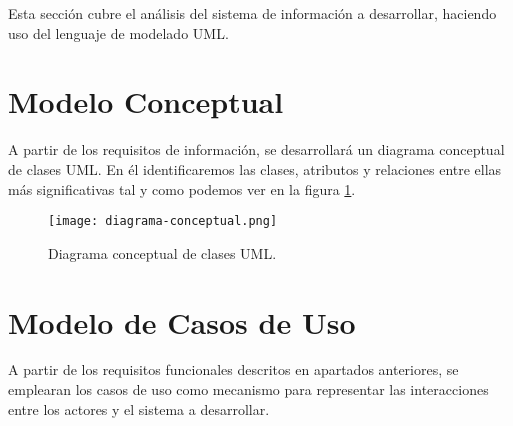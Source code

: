 

Esta sección cubre el análisis del sistema de información a desarrollar, haciendo uso del lenguaje de modelado UML.

\section{Modelo Conceptual}
A partir de los requisitos de información, se desarrollará un diagrama conceptual de clases UML. En él identificaremos las clases, atributos y relaciones entre ellas más significativas tal y como podemos ver en la figura \ref{fig:digclases}.

\begin{figure}[!hpt]
	\begin{center} 
		\texttt{[image: diagrama-conceptual.png]}
		\caption{Diagrama conceptual de clases UML.}
		\label{fig:digclases}
	\end{center}
\end{figure}


\section{Modelo de Casos de Uso}
A partir de los requisitos funcionales descritos en apartados anteriores, se emplearan los casos de uso como mecanismo para representar las interacciones entre los actores y el sistema a desarrollar.

